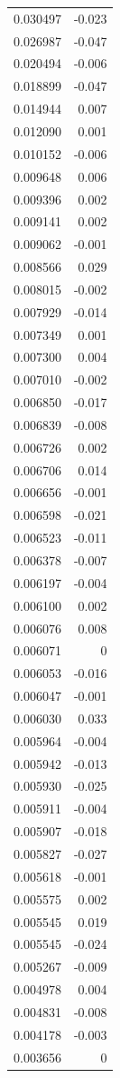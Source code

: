 \documentclass[number, sort&compress, review, 12pt]{elsarticle}
\begin{document}
\begin{longtable}{rr}
0.030497 & -0.023\\
0.026987 & -0.047\\
0.020494 & -0.006\\
0.018899 & -0.047\\
0.014944 & 0.007\\
0.012090 & 0.001\\
0.010152 & -0.006\\
0.009648 & 0.006\\
0.009396 & 0.002\\
0.009141 & 0.002\\
0.009062 & -0.001\\
0.008566 & 0.029\\
0.008015 & -0.002\\
0.007929 & -0.014\\
0.007349 & 0.001\\
0.007300 & 0.004\\
0.007010 & -0.002\\
0.006850 & -0.017\\
0.006839 & -0.008\\
0.006726 & 0.002\\
0.006706 & 0.014\\
0.006656 & -0.001\\
0.006598 & -0.021\\
0.006523 & -0.011\\
0.006378 & -0.007\\
0.006197 & -0.004\\
0.006100 & 0.002\\
0.006076 & 0.008\\
0.006071 & 0\\
0.006053 & -0.016\\
0.006047 & -0.001\\
0.006030 & 0.033\\
0.005964 & -0.004\\
0.005942 & -0.013\\
0.005930 & -0.025\\
0.005911 & -0.004\\
0.005907 & -0.018\\
0.005827 & -0.027\\
0.005618 & -0.001\\
0.005575 & 0.002\\
0.005545 & 0.019\\
0.005545 & -0.024\\
0.005267 & -0.009\\
0.004978 & 0.004\\
0.004831 & -0.008\\
0.004178 & -0.003\\
0.003656 & 0\\
\end{longtable}
\end{document}
